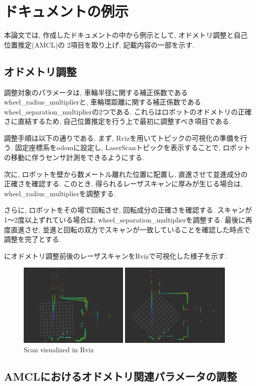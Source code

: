 \section{ドキュメントの例示}
本論文では, 作成したドキュメントの中から例示として, オドメトリ調整と自己位置推定(AMCL)の
2項目を取り上げ, 記載内容の一部を示す. 

\subsection{オドメトリ調整}
調整対象のパラメータは, 車輪半径に関する補正係数であるwheel\_radius\_multiplierと, 車輪環距離に関する補正係数であるwheel\_separation\_multiplierの2つである. 
これらはロボットのオドメトリの正確さに直結するため, 自己位置推定を行う上で最初に調整すべき項目である. 

調整手順は以下の通りである. まず, Rvizを用いてトピックの可視化の準備を行う. 固定座標系をodomに設定し, LaserScanトピックを表示することで, ロボットの移動に伴うセンサ計測をできるようにする. 

次に, ロボットを壁から数メートル離れた位置に配置し, 直進させて並進成分の正確さを確認する. 
このとき, 得られるレーザスキャンに厚みが生じる場合は, wheel\_radius\_multiplierを調整する. 

さらに, ロボットをその場で回転させ, 回転成分の正確さを確認する. 
スキャンが1〜2度以上ずれている場合は, wheel\_separation\_multiplierを調整する. 
最後に再度直進させ, 並進と回転の双方でスキャンが一致していることを確認した時点で調整を完了とする. 

にオドメトリ調整前後のレーザスキャンをRvizで可視化した様子を示す. 
\begin{figure}[h]
     \centering
     \begin{minipage}[c]{65mm}
         \centering
         \includegraphics[height=40mm]{images/before_odom.png}
     \end{minipage}
     \begin{minipage}[c]{65mm}
         \centering
         \includegraphics[height=40mm]{images/after_odom.png}
     \end{minipage}
     \caption{Scan visualized in Rviz}
     \label{fig:Scanvisualizedinrviz}
\end{figure}

\subsection{AMCLにおけるオドメトリ関連パラメータの調整}


